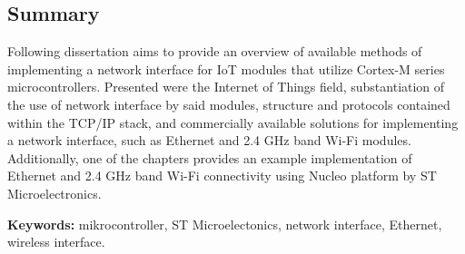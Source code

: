 
\subsection*{Summary}

Following dissertation aims to provide an overview of available methods of implementing a network interface for IoT modules that utilize Cortex-M series microcontrollers. Presented were the Internet of Things field, substantiation of the use of network interface by said modules, structure and protocols contained within the TCP/IP stack, and commercially available solutions for implementing a network interface, such as Ethernet and 2.4 GHz band Wi-Fi modules. Additionally, one of the chapters provides an example implementation of Ethernet and 2.4 GHz band Wi-Fi connectivity using Nucleo platform by ST Microelectronics. 

\vspace{1cm}
\noindent\textbf{Keywords:} mikrocontroller, ST Microelectonics, network interface, Ethernet, wireless interface.
